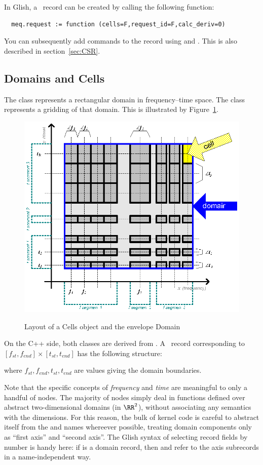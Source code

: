   In Glish, a \Request\ record can be created by calling the following
  function:

  \begin{verbatim}
  meq.request := function (cells=F,request_id=F,calc_deriv=0)
  \end{verbatim}
  
  You can subsequently add commands to the record using 
  and . This is also described in section~\ref{sec:CSR}.
  
\subsection{Domains and Cells}

  The  class represents a rectangular domain in frequency--time
  space. The  class represents a gridding of that domain. This is
  illustrated by Figure~\ref{fig:cells}.
  
  \begin{figure}[th]
  \begin{center}
  \includegraphics[width=.5\textwidth,bb=38 554 327 811]{Figures/Cells.eps}\\
  \end{center}
  \caption{\label{fig:cells}Layout of a Cells object and the envelope Domain}
  \end{figure}
  
  On the C++ side, both classes are derived from . A \Domain\ 
  record corresponding to $[f_{st},f_{end}]\times[t_{st},t_{end}]$ has the following structure:
  
  \qq{[ freq = [ $f_{st},f_{end}$ ], time = [ $t_{st},t_{end}$ ] ]}
  
  where $f_{st},f_{end},t_{st},t_{end}$ are  values giving the domain
  boundaries.

  Note that the specific concepts of {\em frequency} and {\em time} are
  meaningful to only a handful of nodes. The majority of nodes simply deal in
  functions defined over abstract two-dimensional domains (in $\RR^2$), without
  associating any semantics with the dimensions. For this reason, the bulk of
  kernel code is careful to abstract itself from the \qq{freq} and \qq{time}
  names whereever possible, treating domain components only as ``first axis''
  and ``second axis''. The Glish syntax of selecting record fields by number is
  handy here: if \qq{dom} is a domain record, then \qq{dom[1]} and \qq{dom[2]}
  refer to the axis subrecords in a name-independent way.

